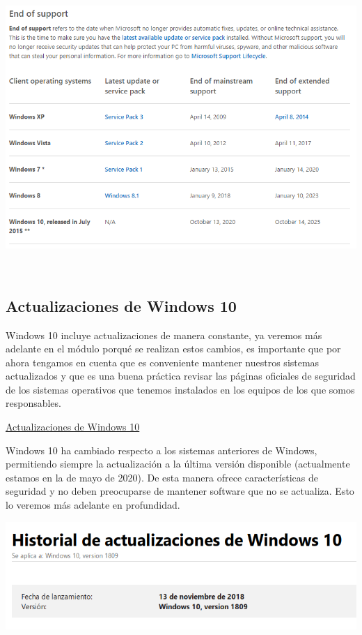 \documentclass[11pt]{article}
\begin{document}
\begin{center}
\includegraphics[width=.9\linewidth]{Versiones/fin-soporte-windows.png}
\end{center}  

\subsection{Actualizaciones de Windows 10}
\label{sec:org9b50a69}
Windows 10 incluye actualizaciones de manera constante, ya veremos más
adelante en el módulo porqué se realizan estos cambios, es importante
que por ahora tengamos en cuenta que es conveniente mantener nuestros
sistemas actualizados y que es una buena práctica revisar las páginas
oficiales de seguridad de los sistemas operativos que tenemos instalados
en los equipos de los que somos responsables.

\href{https://support.microsoft.com/es-es/help/4464619/windows-10-update-history}{Actualizaciones
de Windows 10}

Windows 10 ha cambiado respecto a los sistemas anteriores de Windows,
permitiendo siempre la actualización a la última versión disponible
(actualmente estamos en la de mayo de 2020). De esta manera ofrece características
de seguridad y no deben preocuparse de mantener software que no se
actualiza. Esto lo veremos más adelante en profundidad.

\begin{center}
\includegraphics[width=.9\linewidth]{Versiones/windows10-1809.png}
\end{center}  
\end{document}
